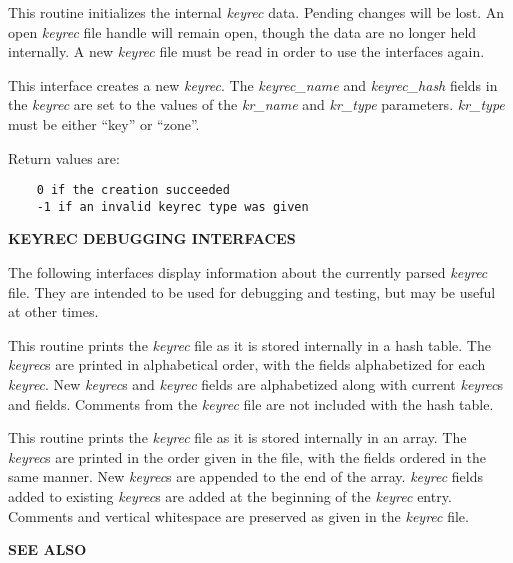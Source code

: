 \begin{description}

\item {}

This routine initializes the internal {\it keyrec} data.  Pending changes will
be lost.  An open {\it keyrec} file handle will remain open, though the data
are no longer held internally.  A new {\it keyrec} file must be read in order
to use the  interfaces again.

\item {}

This interface creates a new {\it keyrec}.  The {\it keyrec\_name} and {\it
keyrec\_hash} fields in the {\it keyrec} are set to the values of the {\it
kr\_name} and {\it kr\_type} parameters.  {\it kr\_type} must be either
``key'' or ``zone''.

Return values are:

\begin{verbatim}
    0 if the creation succeeded
    -1 if an invalid keyrec type was given
\end{verbatim}

\end{description}

{\bf KEYREC DEBUGGING INTERFACES}

The following interfaces display information about the currently parsed
{\it keyrec} file.  They are intended to be used for debugging and testing,
but may be useful at other times.

\begin{description}

\item {}

This routine prints the {\it keyrec} file as it is stored internally in a hash
table.  The {\it keyrec}s are printed in alphabetical order, with the fields
alphabetized for each {\it keyrec}.  New {\it keyrec}s and {\it keyrec} fields
are alphabetized along with current {\it keyrec}s and fields.  Comments from
the {\it keyrec} file are not included with the hash table.

\item {}

This routine prints the {\it keyrec} file as it is stored internally in an
array.  The {\it keyrec}s are printed in the order given in the file, with the
fields ordered in the same manner.  New {\it keyrec}s are appended to the end
of the array.  {\it keyrec} fields added to existing {\it keyrec}s are added
at the beginning of the {\it keyrec} entry.  Comments and vertical whitespace
are preserved as given in the {\it keyrec} file.

\end{description}

{\bf SEE ALSO}


